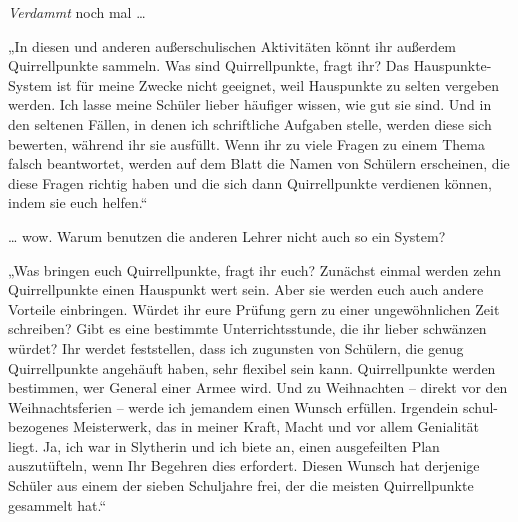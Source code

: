 \emph{Verdammt} noch mal …

„In diesen und anderen außerschulischen Aktivitäten könnt ihr außerdem Quirrellpunkte sammeln. Was sind Quirrellpunkte, fragt ihr? Das Hauspunkte-System ist für meine Zwecke nicht geeignet, weil Hauspunkte zu selten vergeben werden. Ich lasse meine Schüler lieber häufiger wissen, wie gut sie sind. Und in den seltenen Fällen, in denen ich schriftliche Aufgaben stelle, werden diese sich bewerten, während ihr sie ausfüllt. Wenn ihr zu viele Fragen zu einem Thema falsch beantwortet, werden auf dem Blatt die Namen von Schülern erscheinen, die diese Fragen richtig haben und die sich dann Quirrellpunkte verdienen können, indem sie euch helfen.“

… wow. Warum benutzen die anderen Lehrer nicht auch so ein System?

„Was bringen euch Quirrellpunkte, fragt ihr euch? Zunächst einmal werden zehn Quirrellpunkte einen Hauspunkt wert sein. Aber sie werden euch auch andere Vorteile einbringen. Würdet ihr eure Prüfung gern zu einer ungewöhnlichen Zeit schreiben? Gibt es eine bestimmte Unterrichtsstunde, die ihr lieber schwänzen würdet? Ihr werdet feststellen, dass ich zugunsten von Schülern, die genug Quirrellpunkte angehäuft haben, sehr flexibel sein kann. Quirrellpunkte werden bestimmen, wer General einer Armee wird. Und zu Weihnachten – direkt vor den Weihnachtsferien – werde ich jemandem einen Wunsch erfüllen. Irgendein schul-bezogenes Meisterwerk, das in meiner Kraft, Macht und vor allem Genialität liegt. Ja, ich war in Slytherin und ich biete an, einen ausgefeilten Plan auszutüfteln, wenn Ihr Begehren dies erfordert. Diesen Wunsch hat derjenige Schüler aus einem der sieben Schuljahre frei, der die meisten Quirrellpunkte gesammelt hat.“

